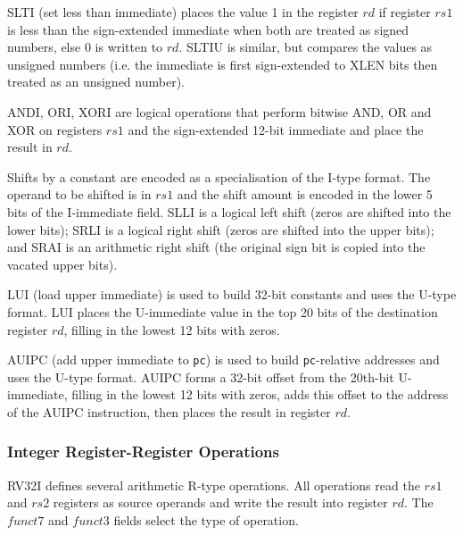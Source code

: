 \documentclass{article}
\begin{document}
SLTI (set less than immediate) places the value 1 in the register $rd$ if register $rs1$ is less than the sign-extended immediate when both are treated as signed numbers, else 0 is written to $rd$. SLTIU is similar, but compares the values as unsigned numbers (i.e. the immediate is first sign-extended to XLEN bits then treated as an unsigned number).

ANDI, ORI, XORI are logical operations that perform bitwise AND, OR and XOR on registers $rs1$ and the sign-extended 12-bit immediate and place the result in $rd$.

Shifts by a constant are encoded as a specialisation of the I-type format. The operand to be shifted is in $rs1$ and the shift amount is encoded in the lower 5 bits of the I-immediate field. SLLI is a logical left shift (zeros are shifted into the lower bits); SRLI is a logical right shift (zeros are shifted into the upper bits); and SRAI is an arithmetic right shift (the original sign bit is copied into the vacated upper bits).

LUI (load upper immediate) is used to build 32-bit constants and uses the U-type format. LUI places the U-immediate value in the top 20 bits of the destination register $rd$, filling in the lowest 12 bits with zeros.

AUIPC (add upper immediate to \texttt{pc}) is used to build \texttt{pc}-relative addresses and uses the U-type format. AUIPC forms a 32-bit offset from the 20th-bit U-immediate, filling in the lowest 12 bits with zeros, adds this offset to the address of the AUIPC instruction, then places the result in register $rd$.

\subsubsection{Integer Register-Register Operations}

RV32I defines several arithmetic R-type operations. All operations read the $rs1$ and $rs2$ registers as source operands and write the result into register $rd$. The $funct7$ and $funct3$ fields select the type of operation.
\end{document}
